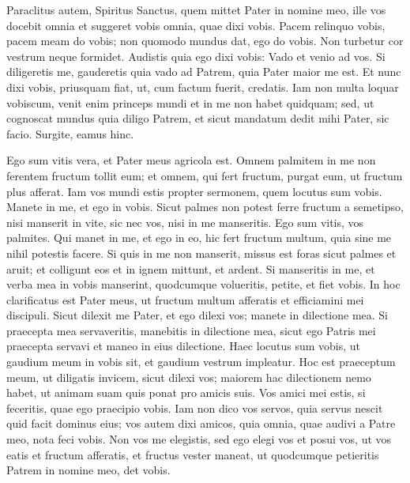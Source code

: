 \begin{biblechapter}
\verse Paraclitus autem, Spiritus Sanctus, quem mittet Pater in nomine meo, ille vos docebit omnia et suggeret vobis omnia, quae dixi vobis. 
\verse Pacem relinquo vobis, pacem meam do vobis; non quomodo mundus dat, ego do vobis. Non turbetur cor vestrum neque formidet.  
\verse Audistis quia ego dixi vobis: Vado et venio ad vos. Si diligeretis me, gauderetis quia vado ad Patrem, quia Pater maior me est. 
\verse Et nunc dixi vobis, priusquam fiat, ut, cum factum fuerit, credatis. 
\verse Iam non multa loquar vobiscum, venit enim princeps mundi et in me non habet quidquam; 
\verse sed, ut cognoscat mundus quia diligo Patrem, et sicut mandatum dedit mihi Pater, sic facio. Surgite, eamus hinc. 
\end{biblechapter}

\begin{biblechapter} 
\verse Ego sum vitis vera, et Pater meus agricola est. 
\verse Omnem palmitem in me non ferentem fructum tollit eum; et omnem, qui fert fructum, purgat eum, ut fructum plus afferat. 
\verse Iam vos mundi estis propter sermonem, quem locutus sum vobis.  
\verse Manete in me, et ego in vobis. Sicut palmes non potest ferre fructum a semetipso, nisi manserit in vite, sic nec vos, nisi in me manseritis. 
\verse Ego sum vitis, vos palmites. Qui manet in me, et ego in eo, hic fert fructum multum, quia sine me nihil potestis facere. 
\verse Si quis in me non manserit, missus est foras sicut palmes et aruit; et colligunt eos et in ignem mittunt, et ardent.  
\verse Si manseritis in me, et verba mea in vobis manserint, quodcumque volueritis, petite, et fiet vobis. 
\verse In hoc clarificatus est Pater meus, ut fructum multum afferatis et efficiamini mei discipuli. 
\verse Sicut dilexit me Pater, et ego dilexi vos; manete in dilectione mea. 
\verse Si praecepta mea servaveritis, manebitis in dilectione mea, sicut ego Patris mei praecepta servavi et maneo in eius dilectione. 
\verse Haec locutus sum vobis, ut gaudium meum in vobis sit, et gaudium vestrum impleatur. 
\verse Hoc est praeceptum meum, ut diligatis invicem, sicut dilexi vos; 
\verse maiorem hac dilectionem nemo habet, ut animam suam quis ponat pro amicis suis.  
\verse Vos amici mei estis, si feceritis, quae ego praecipio vobis. 
\verse Iam non dico vos servos, quia servus nescit quid facit dominus eius; vos autem dixi amicos, quia omnia, quae audivi a Patre meo, nota feci vobis. 
\verse Non vos me elegistis, sed ego elegi vos et posui vos, ut vos eatis et fructum afferatis, et fructus vester maneat, ut quodcumque petieritis Patrem in nomine meo, det vobis.  

\end{biblechapter}
